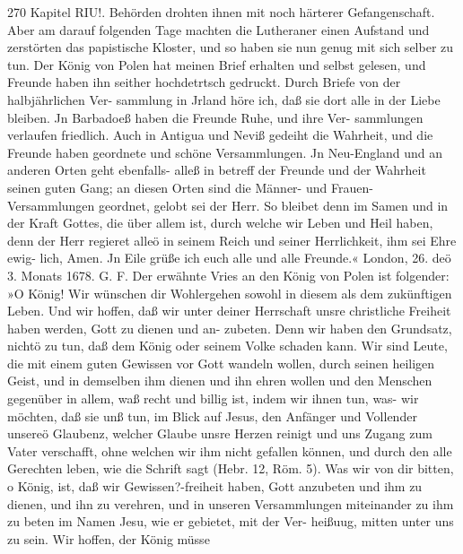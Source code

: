 270 Kapitel RIU!.
Behörden drohten ihnen mit noch härterer Gefangenschaft. Aber
am darauf folgenden Tage machten die Lutheraner einen Aufstand
und zerstörten das papistische Kloster, und so haben sie nun
genug mit sich selber zu tun. Der König von Polen hat meinen
Brief erhalten und selbst gelesen, und Freunde haben ihn seither
hochdetrtsch gedruckt. Durch Briefe von der halbjährlichen Ver-
sammlung in Jrland höre ich, daß sie dort alle in der Liebe
bleiben. Jn Barbadoeß haben die Freunde Ruhe, und ihre Ver-
sammlungen verlaufen friedlich. Auch in Antigua und Neviß
gedeiht die Wahrheit, und die Freunde haben geordnete und
schöne Versammlungen. Jn Neu-England und an anderen Orten
geht ebenfalls- alleß in betreff der Freunde und der Wahrheit
seinen guten Gang; an diesen Orten sind die Männer- und
Frauen-Versammlungen geordnet, gelobt sei der Herr. So bleibet
denn im Samen und in der Kraft Gottes, die über allem ist,
durch welche wir Leben und Heil haben, denn der Herr regieret
alleö in seinem Reich und seiner Herrlichkeit, ihm sei Ehre ewig-
lich, Amen. Jn Eile grüße ich euch alle und alle Freunde.«
London, 26. deö 3. Monats 1678. G. F.
Der erwähnte Vries an den König von Polen ist folgender:
»O König!
Wir wünschen dir Wohlergehen sowohl in diesem als dem
zukünftigen Leben. Und wir hoffen, daß wir unter deiner Herrschaft
unsre christliche Freiheit haben werden, Gott zu dienen und an-
zubeten. Denn wir haben den Grundsatz, nichtö zu tun, daß dem
König oder seinem Volke schaden kann. Wir sind Leute, die mit
einem guten Gewissen vor Gott wandeln wollen, durch seinen
heiligen Geist, und in demselben ihm dienen und ihn ehren wollen
und den Menschen gegenüber in allem, waß recht und billig ist,
indem wir ihnen tun, was- wir möchten, daß sie unß tun, im
Blick auf Jesus, den Anfänger und Vollender unsereö Glaubenz,
welcher Glaube unsre Herzen reinigt und uns Zugang zum
Vater verschafft, ohne welchen wir ihm nicht gefallen können,
und durch den alle Gerechten leben, wie die Schrift sagt (Hebr.
12, Röm. 5). Was wir von dir bitten, o König, ist, daß wir
Gewissen?-freiheit haben, Gott anzubeten und ihm zu dienen, und
ihn zu verehren, und in unseren Versammlungen miteinander zu
ihm zu beten im Namen Jesu, wie er gebietet, mit der Ver-
heißuug, mitten unter uns zu sein. Wir hoffen, der König müsse


